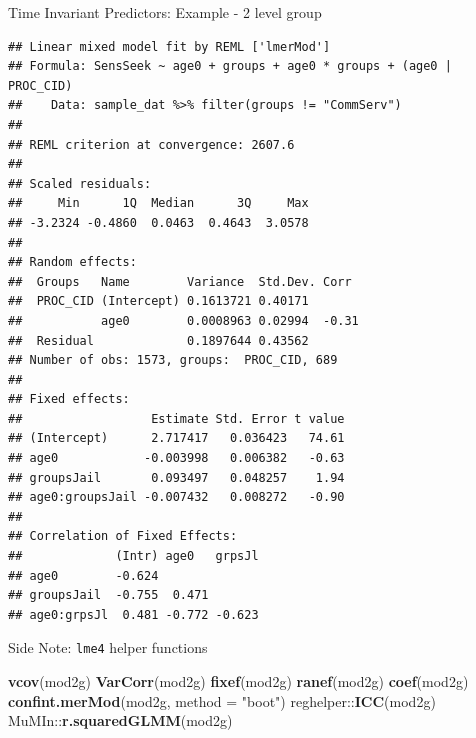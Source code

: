 \documentclass[ignorenonframetext,]{beamer}
\newenvironment{Shaded}{\begin{snugshade}}{\end{snugshade}}
\newcommand{\KeywordTok}[1]{\textcolor[rgb]{0.13,0.29,0.53}{\textbf{{#1}}}}
\newcommand{\DataTypeTok}[1]{\textcolor[rgb]{0.13,0.29,0.53}{{#1}}}
\newcommand{\StringTok}[1]{\textcolor[rgb]{0.31,0.60,0.02}{{#1}}}
\newcommand{\NormalTok}[1]{{#1}}
\begin{document}
\begin{frame}[fragile]{Time Invariant Predictors: Example - 2 level
group}

\tiny

\begin{Shaded}
\end{Shaded}

\tiny

\begin{verbatim}
## Linear mixed model fit by REML ['lmerMod']
## Formula: SensSeek ~ age0 + groups + age0 * groups + (age0 | PROC_CID)
##    Data: sample_dat %>% filter(groups != "CommServ")
## 
## REML criterion at convergence: 2607.6
## 
## Scaled residuals: 
##     Min      1Q  Median      3Q     Max 
## -3.2324 -0.4860  0.0463  0.4643  3.0578 
## 
## Random effects:
##  Groups   Name        Variance  Std.Dev. Corr 
##  PROC_CID (Intercept) 0.1613721 0.40171       
##           age0        0.0008963 0.02994  -0.31
##  Residual             0.1897644 0.43562       
## Number of obs: 1573, groups:  PROC_CID, 689
## 
## Fixed effects:
##                  Estimate Std. Error t value
## (Intercept)      2.717417   0.036423   74.61
## age0            -0.003998   0.006382   -0.63
## groupsJail       0.093497   0.048257    1.94
## age0:groupsJail -0.007432   0.008272   -0.90
## 
## Correlation of Fixed Effects:
##             (Intr) age0   grpsJl
## age0        -0.624              
## groupsJail  -0.755  0.471       
## age0:grpsJl  0.481 -0.772 -0.623
\end{verbatim}

\normalsize

\end{frame}

\begin{frame}[fragile]{Side Note: \texttt{lme4} helper functions}

\begin{Shaded}
\begin{Highlighting}[]
\KeywordTok{vcov}\NormalTok{(mod2g)}
\KeywordTok{VarCorr}\NormalTok{(mod2g)}
\KeywordTok{fixef}\NormalTok{(mod2g)}
\KeywordTok{ranef}\NormalTok{(mod2g)}
\KeywordTok{coef}\NormalTok{(mod2g)}
\KeywordTok{confint.merMod}\NormalTok{(mod2g, }\DataTypeTok{method =} \StringTok{"boot"}\NormalTok{)}
\NormalTok{reghelper::}\KeywordTok{ICC}\NormalTok{(mod2g)}
\NormalTok{MuMIn::}\KeywordTok{r.squaredGLMM}\NormalTok{(mod2g)}
\end{Highlighting}
\end{Shaded}

\end{frame}
\end{document}
